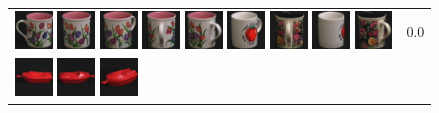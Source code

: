 \begin{figure}[tbp]
\begin{center}
\begin{tabular}{m{11cm} | m{3cm} |}
\includegraphics[width=1cm]{coil/beeld-7.eps}
\includegraphics[width=1cm]{coil/beeld-8.eps}
\includegraphics[width=1cm]{coil/beeld-9.eps}
\includegraphics[width=1cm]{coil/beeld-11.eps}
\includegraphics[width=1cm]{coil/beeld-10.eps}
\includegraphics[width=1cm]{coil/beeld-39.eps}
\includegraphics[width=1cm]{coil/beeld-65.eps}
\includegraphics[width=1cm]{coil/beeld-38.eps}
\includegraphics[width=1cm]{coil/beeld-64.eps}
& {\scriptsize 0.0}
\\
\includegraphics[width=1cm]{coil/beeld-18.eps}
\includegraphics[width=1cm]{coil/beeld-19.eps}
\includegraphics[width=1cm]{coil/beeld-21.eps}

\end{tabular}
\end{center}
\end{figure}
